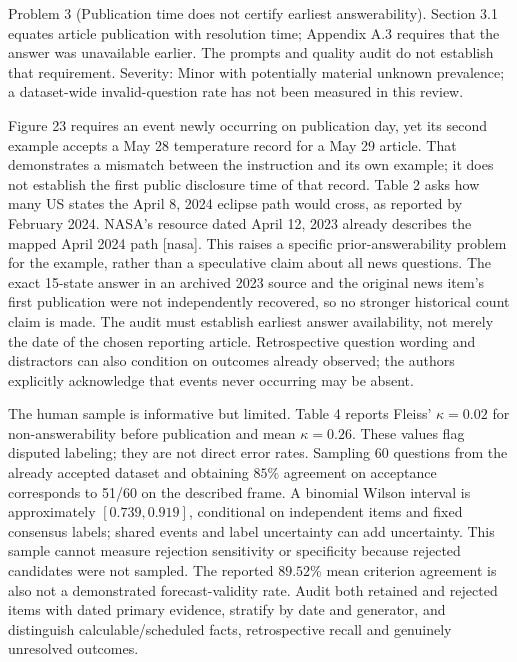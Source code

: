 \documentclass[10pt]{article}
\begin{document}
Problem 3 (Publication time does not certify earliest answerability).  Section 3.1 equates article publication with resolution time; Appendix A.3 requires that the answer was unavailable earlier. The prompts and quality audit do not establish that requirement. Severity: Minor with potentially material unknown prevalence; a dataset-wide invalid-question rate has not been measured in this review.\par
Figure 23 requires an event newly occurring on publication day, yet its second example accepts a May 28 temperature record for a May 29 article. That demonstrates a mismatch between the instruction and its own example; it does not establish the first public disclosure time of that record. Table 2 asks how many US states the April 8, 2024 eclipse path would cross, as reported by February 2024. NASA’s resource dated April 12, 2023 already describes the mapped April 2024 path [nasa]. This raises a specific prior-answerability problem for the example, rather than a speculative claim about all news questions. The exact 15-state answer in an archived 2023 source and the original news item’s first publication were not independently recovered, so no stronger historical count claim is made. The audit must establish earliest answer availability, not merely the date of the chosen reporting article. Retrospective question wording and distractors can also condition on outcomes already observed; the authors explicitly acknowledge that events never occurring may be absent.\par
The human sample is informative but limited. Table 4 reports Fleiss’ \(\kappa=0.02\) for non-answerability before publication and mean \(\kappa=0.26\). These values flag disputed labeling; they are not direct error rates. Sampling 60 questions from the already accepted dataset and obtaining \(85\%\) agreement on acceptance corresponds to 51/60 on the described frame. A binomial Wilson interval is approximately \([0.739,0.919]\), conditional on independent items and fixed consensus labels; shared events and label uncertainty can add uncertainty. This sample cannot measure rejection sensitivity or specificity because rejected candidates were not sampled. The reported \(89.52\%\) mean criterion agreement is also not a demonstrated forecast-validity rate. Audit both retained and rejected items with dated primary evidence, stratify by date and generator, and distinguish calculable/scheduled facts, retrospective recall and genuinely unresolved outcomes.\par
\end{document}
